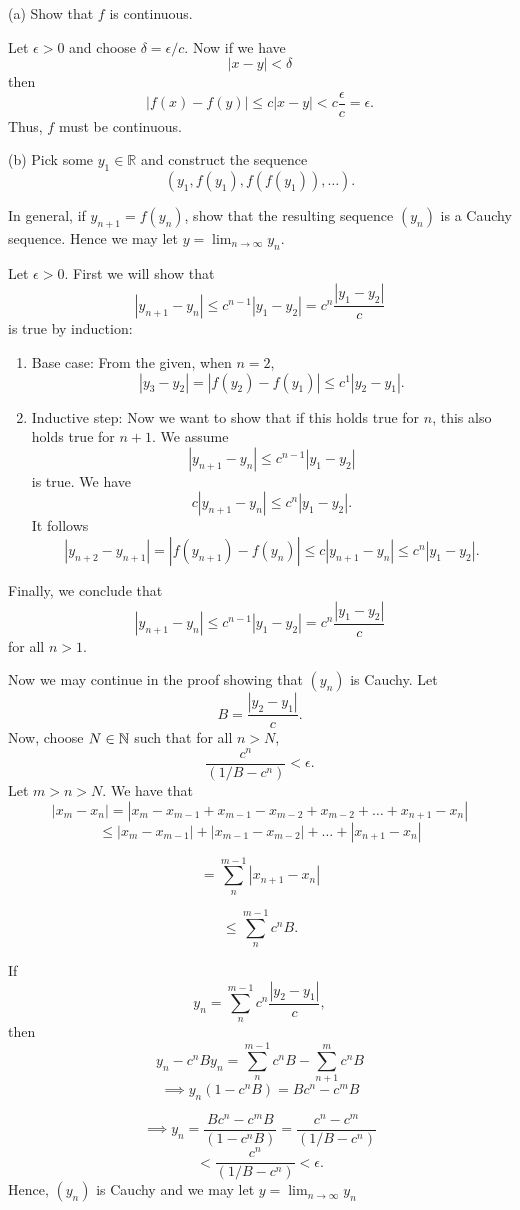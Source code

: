 \documentclass{report}
\begin{document}
(a) Show that $f$ is continuous.
\par
\bigskip
\begin{myproof}
    
Let $\epsilon > 0$ and choose $\delta= \epsilon/c$. Now if we have $$|x-y| < \delta$$ then $$|f(x) - f(y)| \leq c|x-y| < c \frac{\epsilon}{c} = \epsilon.$$
Thus, $f$ must be continuous.
\end{myproof}

\bigskip
\bigskip
(b) Pick some $y_1 \in \mathbb{R}$ and construct the sequence
$$
\left(y_1, f\left(y_1\right), f\left(f\left(y_1\right)\right), \ldots\right) .
$$

In general, if $y_{n+1}=f\left(y_n\right)$, show that the resulting sequence $\left(y_n\right)$ is a Cauchy sequence. Hence we may let $y=\lim _{n \rightarrow \infty} y_n$.

\bigskip
\begin{myproof}
  Let $\epsilon > 0.$ First we will show that $$|y_{n+1} - y_n| \leq c^{n-1}|y_1 - y_2|=c^{n}\frac{|y_1 - y_2|}{c}$$ is true by induction:
\bigskip
\par
\begin{enumerate}
  \item Base case: From the given, when $n=2$, $$|y_3 - y_2| =|f(y_2) - f(y_1)| \leq c^1|y_2 -y_1|.$$
  \item Inductive step: Now we want to show that if this holds true for $n$, this also holds true for $n+1$. We assume  $$ |y_{n+1} - y_n| \leq c^{n-1}|y_1 - y_2|$$ is true. We have $$ c|y_{n+1} - y_n| \leq c^{n}|y_1 - y_2|.$$ It follows
    $$|y_{n+2} - y_{n+1}| =|f(y_{n+1}) - f(y_{n})| \leq c|y_{n+1} - y_n| \leq c^{n}|y_1 - y_2|.$$
\end{enumerate}


Finally, we conclude that  $$|y_{n+1} - y_n| \leq c^{n-1}|y_1 - y_2|=c^{n}\frac{|y_1 - y_2|}{c}$$
for all $n > 1.$

\pagebreak
\bigskip
\par
Now we may continue in the proof showing that $(y_n)$ is Cauchy. Let $$B = \frac{|y_2 - y_1|}{c}.$$
  Now, choose $N \in \NN$ such that for all $n>N$,$$\frac{c^n}{(1/B  - c^{n})}< \epsilon.$$ Let  $m > n > N.$  We have that  
  $$ |x_m - x_n|= |x_m - x_{m-1} + x_{m-1} - x_{m-2} + x_{m-2} + \dots + x_{n+1}- x_n| $$
$$\leq |x_m - x_{m-1}| + |x_{m-1} - x_{m-2}| +  \dots + |x_{n+1}- x_n| $$

$$= \sum_{n}^{m-1}|x_{n+1} - x_n| $$

$$\leq \sum_{n}^{m-1}c^{n}B.$$

If $$y_n =\sum_{n}^{m-1} c^{n}\frac{|y_2 - y_1|}{c},$$ then $$y_n  - c^{n}By_n = \sum_{n}^{m-1} c^{n}B - \sum_{n+1}^{m} c^{n}B$$
$$\implies y_n(1  - c^{n}B) = Bc^n - c^mB $$

$$\implies y_n = \frac{Bc^n - c^mB }{(1  - c^{n}B)}= \frac{c^n - c^m }{(1/B  - c^{n})} $$
$$< \frac{c^n}{(1/B  - c^{n})} < \epsilon.$$
Hence, $(y_n)$ is Cauchy and we may let $y=\lim _{n \rightarrow \infty} y_n$
\end{myproof}
\end{document}
